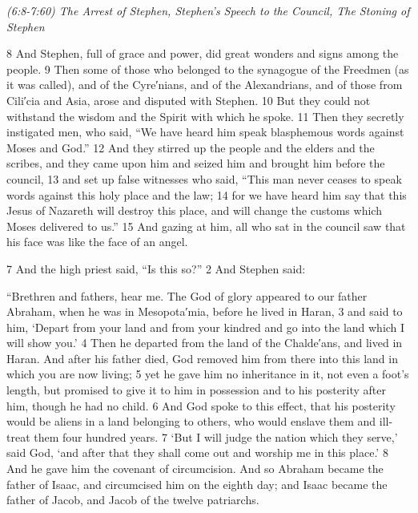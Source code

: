 \documentclass[letterpaper]{report}
\begin{document}
{\centering
	\emph{(6:8-7:60) The Arrest of Stephen,
		Stephen’s Speech to the Council,
		The Stoning of Stephen}\\
}
\begin{multicols}{2}
8 And Stephen, full of grace and power, did great wonders and signs among the people. 9 Then some of those who belonged to the synagogue of the Freedmen (as it was called), and of the Cyre′nians, and of the Alexandrians, and of those from Cili′cia and Asia, arose and disputed with Stephen. 10 But they could not withstand the wisdom and the Spirit with which he spoke. 11 Then they secretly instigated men, who said, “We have heard him speak blasphemous words against Moses and God.” 12 And they stirred up the people and the elders and the scribes, and they came upon him and seized him and brought him before the council, 13 and set up false witnesses who said, “This man never ceases to speak words against this holy place and the law; 14 for we have heard him say that this Jesus of Nazareth will destroy this place, and will change the customs which Moses delivered to us.” 15 And gazing at him, all who sat in the council saw that his face was like the face of an angel.

7 And the high priest said, “Is this so?” 2 And Stephen said:

“Brethren and fathers, hear me. The God of glory appeared to our father Abraham, when he was in Mesopota′mia, before he lived in Haran, 3 and said to him, ‘Depart from your land and from your kindred and go into the land which I will show you.’ 4 Then he departed from the land of the Chalde′ans, and lived in Haran. And after his father died, God removed him from there into this land in which you are now living; 5 yet he gave him no inheritance in it, not even a foot’s length, but promised to give it to him in possession and to his posterity after him, though he had no child. 6 And God spoke to this effect, that his posterity would be aliens in a land belonging to others, who would enslave them and ill-treat them four hundred years. 7 ‘But I will judge the nation which they serve,’ said God, ‘and after that they shall come out and worship me in this place.’ 8 And he gave him the covenant of circumcision. And so Abraham became the father of Isaac, and circumcised him on the eighth day; and Isaac became the father of Jacob, and Jacob of the twelve patriarchs.


\end{multicols}
\end{document}
